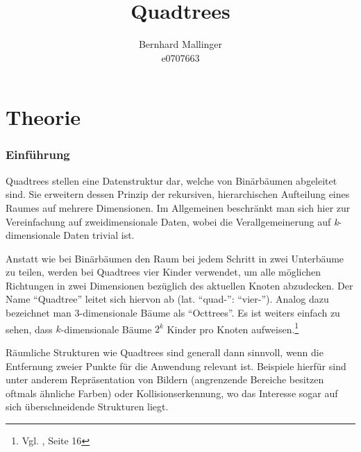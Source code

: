 \documentclass[%
			paper=a4,%
			DIV12,
			draft=false,%
			titlepage
			]{scrartcl}
\title{Quadtrees}
\author{Bernhard Mallinger \\ e0707663}
\newcommand{\zit}[3]{#1 \cite{#2}, #3}
\newcommand{\footzit}[3]{\footnote{\zit{#1}{#2}{#3}}}
\begin{document}
\maketitle

\tableofcontents 

\newpage

%
%
%
%

\part{Theorie}
\section{Einführung}
Quadtrees stellen eine Datenstruktur dar, welche von Binärbäumen abgeleitet sind. Sie erweitern dessen Prinzip der rekursiven, hierarchischen Aufteilung eines Raumes auf mehrere Dimensionen. 
Im Allgemeinen beschränkt man sich hier zur Vereinfachung auf zweidimensionale Daten, wobei die Verallgemeinerung auf \textit{k}-dimensionale Daten trivial ist.

Anstatt wie bei Binärbäumen den Raum bei jedem Schritt in zwei Unterbäume zu teilen, werden bei Quadtrees vier Kinder verwendet, um alle möglichen Richtungen in zwei Dimensionen bezüglich des aktuellen Knoten abzudecken. Der Name "`Quadtree"' leitet sich hiervon ab (lat. "`quad-"': "`vier-"'). 
Analog dazu bezeichnet man 3-dimensionale Bäume als "`Octtrees"'. Es ist weiters einfach zu sehen, dass $k$-dimensionale Bäume $2^k$ Kinder pro Knoten aufweisen.\footzit{Vgl.}{Bentley:1979}{Seite 16}

Räumliche Strukturen wie Quadtrees sind generall dann sinnvoll, wenn die Entfernung zweier Punkte für die Anwendung relevant ist. Beispiele hierfür sind unter anderem Repräsentation von Bildern (angrenzende Bereiche besitzen oftmals ähnliche Farben) oder Kollisionserkennung, wo das Interesse sogar auf sich überschneidende Strukturen liegt.
\end{document}
